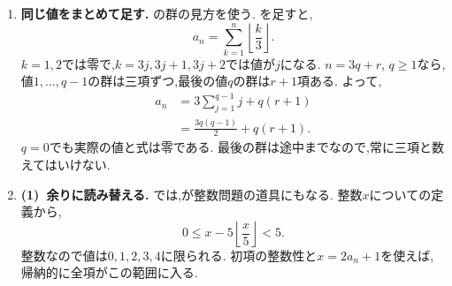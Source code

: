 \begin{enumerate}[label=\textbf{問\arabic*.},leftmargin=3.8em,format=\bookitemlink{practice-special}{solution}{problem}]
                \smallskip
                \textbf{(2)~1未満になる位置.}
                $\displaystyle 2^{10}=1024\le2026<2048=2^{11}$だから,
                \[
                  a_{11}=1,\qquad a_{12}=0.
                \]
                $\displaystyle n\le11$では切り捨てる前の値が$\displaystyle 1$以上なので,
                初めて$\displaystyle 0$となるのは$\displaystyle n=12$である.
                毎回の切り捨てを一つのにまとめられる理由は,割る数が正の整数であることにある.
          \item \textbf{同じ値をまとめて足す.}
                の群の見方を使う.
                を足すと,
                \[
                  a_n=\sum_{k=1}^{n}\left\lfloor\frac{k}{3}\right\rfloor.
                \]
                $k=1,2$では零で,$k=3j,3j+1,3j+2$では値が$j$になる.
                $n=3q+r$, $q\ge1$なら,値$1,\ldots,q-1$の群は三項ずつ,最後の値$q$の群は$r+1$項ある.
                よって,
                \begin{align*}
                  a_n&=3\sum_{j=1}^{q-1}j+q(r+1)\\
                     &=\frac{3q(q-1)}2+q(r+1).
                \end{align*}
                $q=0$でも実際の値と式は零である.
                最後の群は途中までなので,常に三項と数えてはいけない.
          \item \textbf{(1)~余りに読み替える.}
                では,が整数問題の道具にもなる.
                整数$\displaystyle x$についての定義から,
                \[
                  0\le x-5\left\lfloor\frac{x}{5}\right\rfloor<5.
                \]
                整数なので値は$0,1,2,3,4$に限られる.
                初項の整数性と$x=2a_n+1$を使えば,帰納的に全項がこの範囲に入る.


\end{enumerate}
